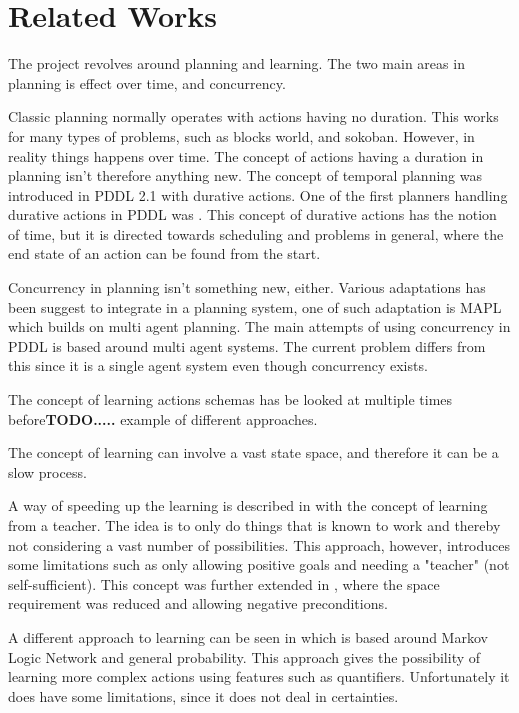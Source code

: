 \section{Related Works}
The project revolves around planning and learning. The two main areas in planning is effect over time, and concurrency. 

Classic planning normally operates with actions having no duration. This works for many types of problems, such as blocks world, and sokoban. However, in reality things happens over time. The concept of actions having a duration in planning isn't therefore anything new. The concept of temporal planning was introduced in PDDL 2.1 with durative actions. One of the first planners handling durative actions in PDDL was \cite{durative}. This concept of durative actions has the notion of time, but it is directed towards scheduling and problems in general, where the end state of an action can be found from the start.
%
%	
%
%	
%	



Concurrency in planning isn't something new, either. Various adaptations  has been suggest to integrate in a planning system, one of such adaptation is MAPL which builds on multi agent planning\cite{mapl}. The main attempts of using concurrency in PDDL is based around multi agent systems. The current problem differs from this since it is a single agent system even though concurrency exists. 

The concept of learning actions schemas has be looked at multiple times before\textbf{\huge TODO.....} example of different approaches.

The concept of learning can involve a vast state space, and therefore it can be a slow process. 

A way of speeding up the learning is described in \cite{Action-Schemas} with the concept of learning from a teacher. The idea is to only do things that is known to work and thereby not considering a vast number of possibilities. This approach, however, introduces some limitations such as only allowing positive goals and needing a "teacher" (not self-sufficient). This concept was further extended in \cite{jacobsen2015a}, where the space requirement was reduced and allowing negative preconditions.

A different approach to learning can be seen in \cite{zhuo2010a} which is based around Markov Logic Network and general probability. This approach gives the possibility of learning more complex actions using features such as quantifiers. Unfortunately it does have some limitations, since it does not deal in certainties.

